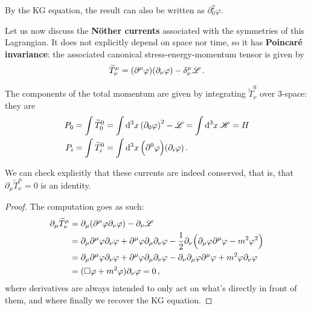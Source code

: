 \documentclass[main.tex]{subfiles}
\begin{document}
By the KG equation, the result can also be written as \(\partial_{0}^2 \varphi\).

Let us now discuss the \textbf{Nöther currents} associated with the symmetries of this Lagrangian. It does not explicitly depend on space nor time, so it has \textbf{Poincaré invariance}: the associated canonical stress-energy-momentum tensor is given by 
%
\begin{align}
\widetilde{T}^{\mu }_{\nu }
= \qty(\partial^{\mu } \varphi ) \qty(\partial_{\nu } \varphi ) - \delta^{\mu }_{\nu }\mathscr{L} 
\,.
\end{align}

The components of the total momentum are given by integrating \(\widetilde{T}^{0}_{\nu }\) over 3-space: they are 
%
\begin{align}
P_{0} &= \int \widetilde{T}^{0}_{0} = \int \dd[3]{x} \qty(\partial_{0}\varphi )^2  - \mathscr{L} = \int \dd[3]{x} \mathscr{H}= H  \\
P_{i} &= \int \widetilde{T}^{0}_{i} = \int \dd[3]{x} \qty(\partial^{0}\varphi) \qty(\partial_{i} \varphi )
\,.
\end{align}

\begin{claim}
We can check explicitly that these currents are indeed conserved, that is, that \(\partial_{\mu } \widetilde{T}^{\mu }_{\nu } =0 \) is an identity. 
\end{claim}

\begin{proof}
The computation goes as such: 
%
\begin{align}
\partial_{\mu } \widetilde{T}^{\mu }_{\nu } &= \partial_{\mu } \qty(\partial^{\mu } \varphi \partial_{\nu } \varphi ) - \partial_{\nu } \mathscr{L}  \\
&= \partial_{\mu } \partial^{\mu } \varphi \partial_{\nu } \varphi 
+ \partial^{\mu }\varphi \partial_{\mu } \partial_{\nu } \varphi 
- \frac{1}{2} \partial_{\nu } \qty( \partial_{\mu } \varphi \partial^{\mu } \varphi  -  m^2 \varphi^2)  \\
&= \partial_{\mu } \partial^{\mu } \varphi \partial_{\nu } \varphi 
+ \partial^{\mu }\varphi \partial_{\mu } \partial_{\nu } \varphi 
- \partial_{\nu } \partial_{\mu } \varphi \partial^{\mu } \varphi 
+ m^2 \varphi \partial_{\nu } \varphi   \\
&= (\square \varphi + m^2 \varphi ) \partial_{\nu }\varphi  = 0
\,,
\end{align}
%
where derivatives are always intended to only act on what's directly in front of them, and where finally we recover the KG equation. 
\end{proof}
\end{document}
